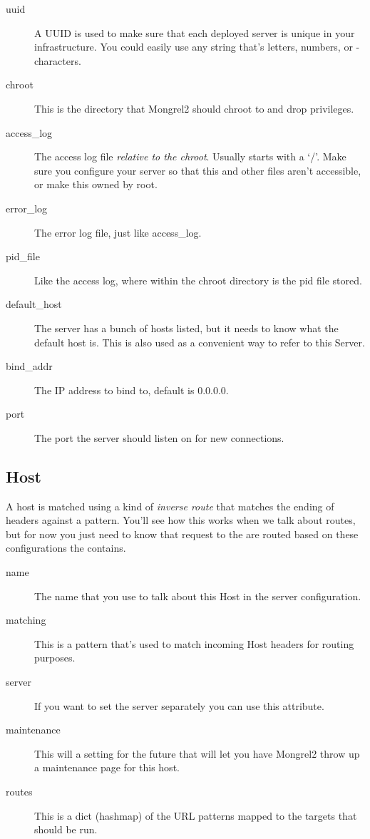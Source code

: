 \begin{description}
\item[uuid] A UUID is used to make sure that each deployed server is unique in your infrastructure.
    You could easily use any string that's letters, numbers, or - characters.
\item[chroot] This is the directory that Mongrel2 should chroot to and drop privileges.
\item[access\_log] The access log file \emph{relative to the chroot}.  Usually starts with a `/'.  Make sure
    you configure your server so that this and other files aren't accessible, or make this owned by root.
\item[error\_log] The error log file, just like access\_log.
\item[pid\_file] Like the access log, where within the chroot directory is the pid file stored.
\item[default\_host] The server has a bunch of hosts listed, but it needs to know what the default host is.  This is also
    used as a convenient way to refer to this Server.
\item[bind\_addr] The IP address to bind to, default is 0.0.0.0.
\item[port] The port the server should listen on for new connections.
\end{description}


\subsection{Host}

A host is matched using a kind of \emph{inverse route} that matches the ending of 
headers against a pattern.  You'll see how this works when we talk about routes, but for now
you just need to know that request to the  are routed based on these 
configurations the  contains.

\begin{description}
\item[name] The name that you use to talk about this Host in the server configuration.
\item[matching] This is a pattern that's used to match incoming Host headers for routing purposes.
\item[server] If you want to set the server separately you can use this attribute.
\item[maintenance] This will a setting for the future that will let you have Mongrel2 throw up a maintenance page
    for this host.
\item[routes] This is a dict (hashmap) of the URL patterns mapped to the targets that should be run.
\end{description}


